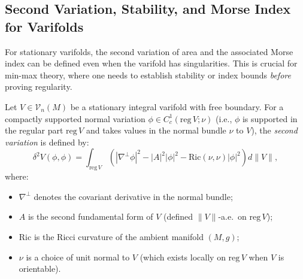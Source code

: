 \subsection{Second Variation, Stability, and Morse Index for Varifolds}\label{subsec:varifold-second-variation}


For stationary varifolds, the second variation of area and the associated Morse index can be defined even when the varifold has singularities. This is crucial for min-max theory, where one needs to establish stability or index bounds \emph{before} proving regularity. 

\begin{definition}\label{def:second-variation-varifold}
Let $V \in \mathcal{V}_n(M)$ be a stationary integral varifold with free boundary. For a compactly
supported normal variation $\phi \in C^1_c(\mathrm{reg}\, V; \nu)$ (i.e., $\phi$ is supported in the
regular part $\mathrm{reg}\, V$ and takes values in the normal bundle $\nu$ to $V$), the
\emph{second variation} is defined by:
\[
    \delta^2 V(\phi, \phi) = \int_{\mathrm{reg}\, V} \left( |\nabla^\perp \phi|^2 - |A|^2 |\phi|^2 - \mathrm{Ric}(\nu, \nu)|\phi|^2 \right) d\|V\|,
\]
where:
\begin{itemize}
    \item $\nabla^\perp$ denotes the covariant derivative in the normal bundle;
    \item $A$ is the second fundamental form of $V$ (defined $\|V\|$-a.e.\ on $\mathrm{reg}\, V$);
    \item $\mathrm{Ric}$ is the Ricci curvature of the ambient manifold $(M, g)$;
    \item $\nu$ is a choice of unit normal to $V$ (which exists locally on $\mathrm{reg}\, V$ when
    $V$ is orientable).
\end{itemize}
\end{definition}

